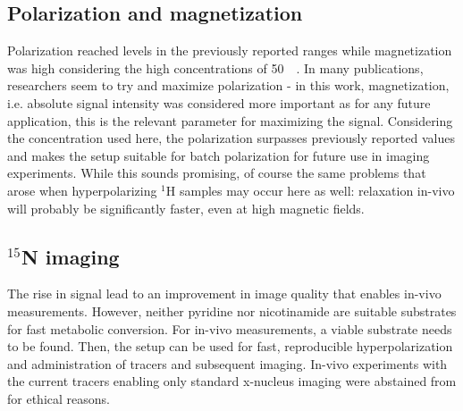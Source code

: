         \subsection{Polarization and magnetization}
            Polarization reached levels in the previously reported ranges while magnetization was high considering the high concentrations of \SI{50}{\milli\molar}. In many publications, researchers seem to try and maximize polarization - in this work, magnetization, i.e. absolute signal intensity was considered more important as for any future application, this is the relevant parameter for maximizing the signal. Considering the concentration used here, the polarization surpasses previously reported values and makes the setup suitable for batch polarization for future use in imaging experiments. While this sounds promising, of course the same problems that arose when hyperpolarizing $^{1}$H samples may occur here as well: relaxation in-vivo will probably be significantly faster, even at high magnetic fields.
        \subsection{$^{15}$N imaging}
            The rise in signal lead to an improvement in image quality that enables in-vivo measurements. However, neither pyridine nor nicotinamide are suitable substrates for fast metabolic conversion. For in-vivo measurements, a viable substrate needs to be found. Then, the setup can be used for fast, reproducible hyperpolarization and administration of tracers and subsequent imaging. In-vivo experiments with the current tracers enabling only standard x-nucleus imaging were abstained from for ethical reasons.
